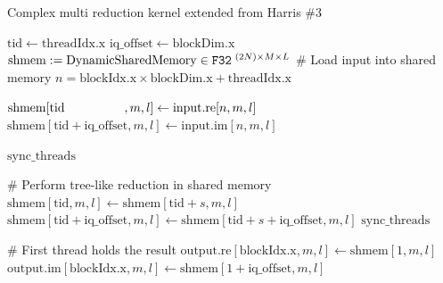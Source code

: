 \documentclass{juliacon}
\begin{document}
\begin{algorithm}[h]
    \caption{\label{alg:reduce-cplx} Complex multi reduction kernel extended from Harris \#3}
    
    \begin{algorithmic}[1]
            \vspace{1mm}
            \State $\mathrm{tid} \gets \mathrm{threadIdx.x}$
            \State $\mathrm{iq\_offset} \gets \mathrm{blockDim.x}$
            \State $\mathrm{shmem} := \mathrm{DynamicSharedMemory} \in \mathtt{F32}^{\hspace{1mm}(2N)\times M \times L}$
            \vspace{4mm}
            \State \# Load input into shared memory
            \State $n = \mathrm{blockIdx.x} \times \mathrm{blockDim.x} + \mathrm{threadIdx.x}$

                \vspace{1mm}
                    \State $\mathrm{shmem}[\mathrm{tid} \hspace{4.8em}, m, l] \gets \mathrm{input.re}[n, m, l]$
                    \State $\mathrm{shmem}[\mathrm{tid}+\mathrm{iq\_offset}, m, l] \gets \mathrm{input.im}[n, m, l]$
                \EndIf

                \vspace{2mm}
                \State $\mathrm{sync\_threads}$ 
                \vspace{2mm}

                \State \# Perform tree-like reduction in shared memory
                    \vspace{1mm}
                        \State $\mathrm{shmem}[\mathrm{tid}, m, l] \gets \mathrm{shmem}[\mathrm{tid} + s, m, l]$
                        \State $\mathrm{shmem}[\mathrm{tid}+\mathrm{iq\_offset}, m, l] \gets \mathrm{shmem}[\mathrm{tid} + s +\mathrm{iq\_offset}, m, l] $
                        \vspace{2mm}
                        \State $\mathrm{sync\_threads}$ 
                    \EndIf
                \EndFor

                \vspace{4mm}
                \State \# First thread holds the result
                    \State $\mathrm{output.re}[\mathrm{blockIdx.x}, m, l] \gets \mathrm{shmem}[1, m, l]$
                    \State $\mathrm{output.im}[\mathrm{blockIdx.x}, m, l] \gets \mathrm{shmem}[1 + \mathrm{iq\_offset}, m, l]$
                \EndIf
            \EndFor
        \EndProcedure
    \end{algorithmic}
\end{algorithm}
\end{document}
